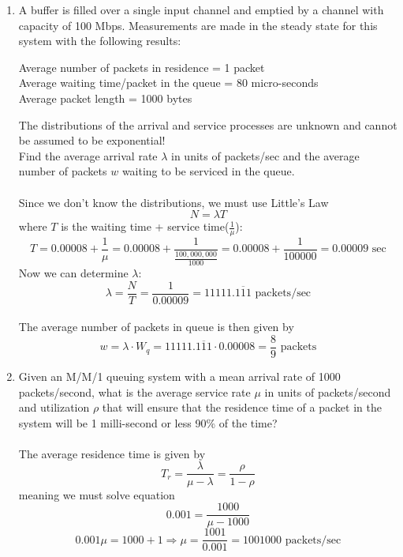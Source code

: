 \documentclass[12pt]{article}
\begin{document}
\begin{enumerate}
\item A buffer is filled over a single input channel and emptied by a channel with capacity of 100 Mbps. Measurements are made in the steady state for this system with the following results: \\
  \begin{center}
    Average number of packets in residence  = 1 packet \\
    Average waiting time/packet in the queue =  80 micro-seconds \\
    Average packet length = 1000 bytes \\
  \end{center}
  The distributions of the arrival and service processes are unknown and cannot be assumed to be exponential! \\ 
  Find the average arrival rate $\lambda$ in units of packets/sec and the average number of packets $w$ waiting to be serviced in the queue. \\ \\

  Since we don't know the distributions, we must use Little's Law
  \[ N = \lambda T \] 
  where $T$ is the waiting time + service time($\frac{1}{\mu}$):
  \[ T = 0.00008 + \frac{1}{\mu} = 0.00008 + \frac{1}{\frac{100,000,000}{1000}} = 0.00008 + \frac{1}{100000} = 0.00009 \textrm{ sec} \]
  Now we can determine $\lambda$: 
  \[ \lambda = \frac{N}{T} = \frac{1}{0.00009} = 11111.\overline{111} \textrm{ packets/sec} \]
  \\
  The average number of packets in queue is then given by 
  \[ w = \lambda \cdot W_q = 11111.\overline{111} \cdot 0.00008 = \frac{8}{9} \textrm{ packets} \]

\newpage

\item Given an M/M/1 queuing system with a mean arrival rate of 1000 packets/second, what is the average service rate $\mu$ in units of packets/second and utilization $\rho$ that will ensure that the residence time of a packet in the system will be 1 milli-second or less 90\% of the time? \\ \\

The average residence time is given by 
\[T_r = \frac{\lambda}{\mu - \lambda} = \frac{\rho}{1-\rho}\]
meaning we must solve equation
\[ 0.001 = \frac{1000}{\mu - 1000} \]
\[ 0.001\mu = 1000 + 1 \Rightarrow \mu = \frac{1001}{0.001} = 1001000 \textrm{ packets/sec} \]

\newpage


\end{enumerate}
\end{document}
